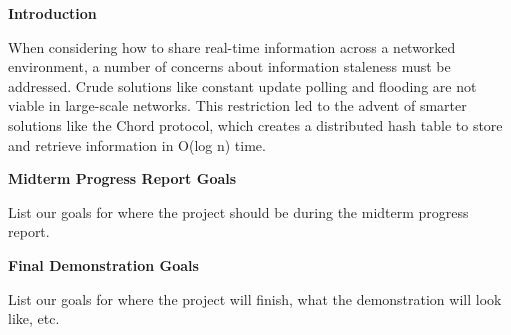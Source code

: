 \begin{large}
    \noindent\textbf{Introduction}
\end{large}

\vspace{5pt}

When considering how to share real-time information across a networked environment, a number of concerns about information staleness must be addressed.
Crude solutions like constant update polling and flooding are not viable in large-scale networks.
This restriction led to the advent of smarter solutions like the Chord protocol, which creates a distributed hash table to store and retrieve information in O(log n) time.

\vspace{5pt}

\begin{large}
    \noindent\textbf{Midterm Progress Report Goals}
\end{large}

List our goals for where the project should be during the midterm progress report.

\vspace{5pt}

\begin{large}
    \noindent\textbf{Final Demonstration Goals}
\end{large}

List our goals for where the project will finish, what the demonstration will look like, etc.

\pagebreak